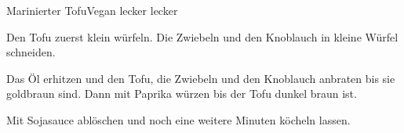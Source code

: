
\begin{recipe}[]{Marinierter Tofu}{Vegan lecker lecker}{}



\step
Den Tofu zuerst klein w\"urfeln. Die Zwiebeln und den Knoblauch in kleine W\"urfel schneiden.

\step
Das \"Ol erhitzen und den Tofu, die Zwiebeln und den Knoblauch anbraten bis sie goldbraun sind. Dann mit Paprika w\"urzen bis der Tofu dunkel braun ist.

\step
Mit Sojasauce abl\"oschen und noch eine weitere Minuten k\"ocheln lassen.

\end{recipe}
